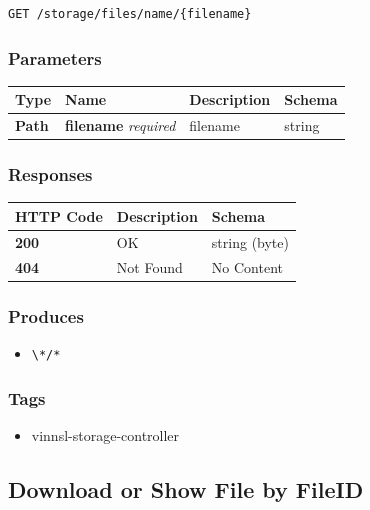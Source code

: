\begin{verbatim}
GET /storage/files/name/{filename}
\end{verbatim}

\subsubsection{Parameters}\label{parameters-14}

\begin{longtable}[]{@{}llll@{}}
\toprule
Type & Name & Description & Schema\tabularnewline
\midrule
\endhead
\textbf{Path} & \textbf{filename} \emph{required} & filename &
string\tabularnewline
\bottomrule
\end{longtable}

\subsubsection{Responses}\label{responses-17}

\begin{longtable}[]{@{}lll@{}}
\toprule
HTTP Code & Description & Schema\tabularnewline
\midrule
\endhead
\textbf{200} & OK & string (byte)\tabularnewline
\textbf{404} & Not Found & No Content\tabularnewline
\bottomrule
\end{longtable}

\subsubsection{Produces}\label{produces-17}

\begin{itemize}
\tightlist
\item
  \texttt{\textbackslash{}*/*}
\end{itemize}

\subsubsection{Tags}\label{tags-17}

\begin{itemize}
\tightlist
\item
  vinnsl-storage-controller
\end{itemize}

\subsection{Download or Show File by
FileID}\label{download-or-show-file-by-fileid}

